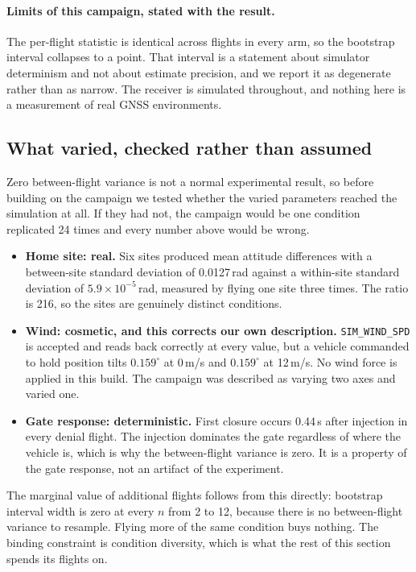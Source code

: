 \documentclass[11pt,a4paper]{article}
\newcommand{\code}[1]{\texttt{\small #1}}
\begin{document}
\paragraph{Limits of this campaign, stated with the result.} The per-flight
statistic is identical across flights in every arm, so the bootstrap interval
collapses to a point. That interval is a statement about simulator determinism
and not about estimate precision, and we report it as degenerate rather than as
narrow. The receiver is simulated throughout, and nothing here is a measurement
of real GNSS environments.

\subsection{What varied, checked rather than assumed}
\label{sec:variance}

Zero between-flight variance is not a normal experimental result, so before
building on the campaign we tested whether the varied parameters reached the
simulation at all. If they had not, the campaign would be one condition
replicated 24 times and every number above would be wrong.

\begin{itemize}
\item \textbf{Home site: real.} Six sites produced mean attitude differences
with a between-site standard deviation of 0.0127\,rad against a within-site
standard deviation of $5.9 \times 10^{-5}$\,rad, measured by flying one site
three times. The ratio is 216, so the sites are genuinely distinct conditions.
\item \textbf{Wind: cosmetic, and this corrects our own description.}
\code{SIM\_WIND\_SPD} is accepted and reads back correctly at every value, but
a vehicle commanded to hold position tilts $0.159^\circ$ at 0\,m/s and
$0.159^\circ$ at 12\,m/s. No wind force is applied in this build. The campaign
was described as varying two axes and varied one.
\item \textbf{Gate response: deterministic.} First closure occurs 0.44\,s after
injection in every denial flight. The injection dominates the gate regardless
of where the vehicle is, which is why the between-flight variance is zero. It
is a property of the gate response, not an artifact of the experiment.
\end{itemize}

The marginal value of additional flights follows from this directly: bootstrap
interval width is zero at every $n$ from 2 to 12, because there is no
between-flight variance to resample. Flying more of the same condition buys
nothing. The binding constraint is condition diversity, which is what the rest
of this section spends its flights on.
\end{document}
